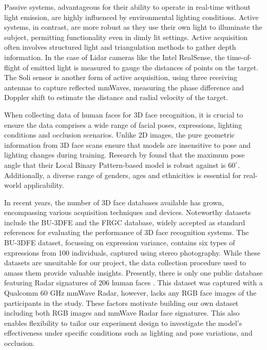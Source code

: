 \documentclass{interim}
\begin{document}
Passive systems, advantageous for their ability to operate in real-time without light emission, are highly influenced by environmental lighting conditions. Active systems, in contrast, are more robust as they use their own light to illuminate the subject, permitting functionality even in dimly lit settings. Active acquisition often involves structured light and triangulation methods to gather depth information. In the case of Lidar cameras like the Intel RealSense, the time-of-flight of emitted light is measured to gauge the distances of points on the target. The Soli sensor is another form of active acquisition, using three receiving antennas to capture reflected mmWaves, measuring the phase difference and Doppler shift to estimate the distance and radial velocity of the target. 

When collecting data of human faces for 3D face recognition, it is crucial to ensure the data comprises a wide range of facial poses, expressions, lighting conditions and occlusion scenarios. Unlike 2D images, the pure geometric information from 3D face scans ensure that models are insensitive to pose and lighting changes during training. Research by \cite{prabhu2011unconstrained} found that the maximum pose angle that their Local Binary Pattern-based model is robust against is $60^\circ$. Additionally, a diverse range of genders, ages and ethnicities is essential for real-world applicability.

In recent years, the number of 3D face databases available has grown, encompassing various acquisition techniques and devices. Noteworthy datasets include the BU-3DFE \cite{yin20063d} and the FRGC \cite{phillips2005overview} database, widely accepted as standard references for evaluating the performance of 3D face recognition systems. The BU-3DFE dataset, focussing on expression variance, contains six types of expressions from 100 individuals, captured using stereo photography. While these datasets are unsuitable for our project, the data collection procedure used to amass them provide valuable insights. Presently, there is only one public database featuring Radar signatures of 206 human faces \cite{mmwavefacedata}. This dataset was captured with a Qualcomm 60 GHz mmWave Radar, however, lacks any RGB face images of the participants in the study. These factors motivate building our own dataset including both RGB images and mmWave Radar face signatures. This also enables flexibility to tailor our experiment design to investigate the model's effectiveness under specific conditions such as lighting and pose variations, and occlusion.
\end{document}

